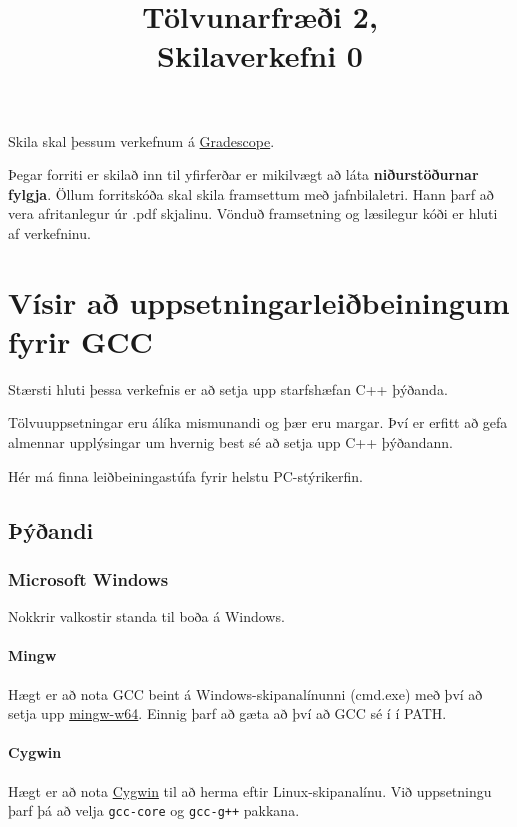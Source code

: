 \documentclass{article}
\title{Tölvunarfræði 2, \semester \\ Skilaverkefni 0}
\author{}
\begin{document}
\maketitle
{}

Skila skal þessum verkefnum á \href{https://gradescope.com/courses/14122}{Gradescope}.

Þegar forriti er skilað inn til yfirferðar er mikilvægt að láta \textbf{niðurstöðurnar fylgja}. Öllum forritskóða skal skila framsettum með jafnbilaletri. Hann þarf að vera afritanlegur úr .pdf skjalinu. Vönduð framsetning og læsilegur kóði er hluti af verkefninu.

\section{Vísir að uppsetningarleiðbeiningum fyrir GCC}

Stærsti hluti þessa verkefnis er að setja upp starfshæfan C++ þýðanda.

Tölvuuppsetningar eru álíka mismunandi og þær eru margar. Því er erfitt að gefa almennar upplýsingar um hvernig best sé að setja upp C++ þýðandann.

Hér má finna leiðbeiningastúfa fyrir helstu PC-stýrikerfin.

\subsection{Þýðandi}

\subsubsection{Microsoft Windows}

Nokkrir valkostir standa til boða á Windows.

\paragraph{Mingw} Hægt er að nota GCC beint á Windows-skipanalínunni (cmd.exe) með því að setja upp \href{http://mingw-w64.org}{mingw-w64}. Einnig þarf að gæta að því að GCC sé í í PATH.

\paragraph{Cygwin} Hægt er að nota \href{https://www.cygwin.com/}{Cygwin} til að herma eftir Linux-skipanalínu. Við uppsetningu þarf þá að velja \texttt{gcc-core} og \texttt{gcc-g++} pakkana.
\end{document}
